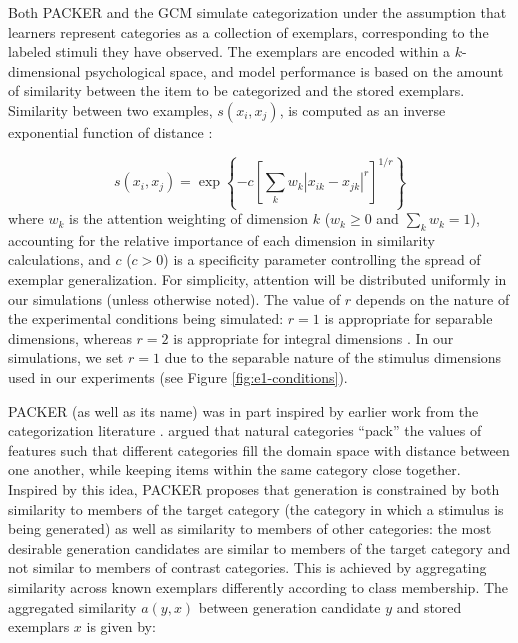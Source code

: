 \documentclass[12pt]{article}
\begin{document}
\begin{flushleft}
Both PACKER and the GCM simulate categorization under the assumption that
learners represent categories as a collection of exemplars, corresponding to the
labeled stimuli they have observed. The exemplars are encoded within a
$k$-dimensional psychological space, and model performance is based on the
amount of similarity between the item to be categorized and the stored
exemplars. Similarity between two examples, $s\left(x_i, x_j\right)$, is
computed as an inverse exponential function of distance
\citep[following][]{attneave1950,shepard1957stimulus,shepard1987toward}:

\begin{equation} s\left(x_i,x_j\right) = \exp \left\{ -c \left[\sum_{k}{ w_k
\left| x_{ik} - x_{jk} \right|^r }\right]^{1/r} \right\}
\label{eq:similarity}
\end{equation}
% 
where $w_k$ is the attention weighting of dimension $k$ ($w_k \geq 0$ and
$\sum_k{w_k} = 1$), accounting for the relative importance of each dimension in
similarity calculations, and $c$ ($c>0$) is a specificity parameter controlling
the spread of exemplar generalization. For simplicity, attention will be
distributed uniformly in our simulations (unless otherwise noted). The value of
$r$ depends on the nature of the experimental conditions being simulated: $r=1$
is appropriate for separable dimensions, whereas $r=2$ is appropriate for
integral dimensions \citep[e.g.,][]{shepard1964attention,garner1974processing}.
In our simulations, we set $r=1$ due to the separable nature of the stimulus
dimensions used in our experiments (see Figure \ref{fig:e1-conditions}).

PACKER (as well as its name) was in part inspired by earlier work from the
categorization literature \citep{hidaka2011packing,stewart2005}. \citet{hidaka2011packing} argued that
natural categories ``pack'' the values of features such that different
categories fill the domain space with distance between one another, while
keeping items within the same category close together. Inspired by this idea,
PACKER proposes that generation is constrained by both similarity to members of
the target category (the category in which a stimulus is being generated) as
well as similarity to members of other categories: the most desirable generation
candidates are similar to members of the target category and not similar to
members of contrast categories. This is achieved by aggregating similarity
across known exemplars differently according to class membership. The aggregated
similarity $a(y,x)$ between generation candidate $y$ and stored exemplars $x$ is
given by:


\end{flushleft}
\end{document}
